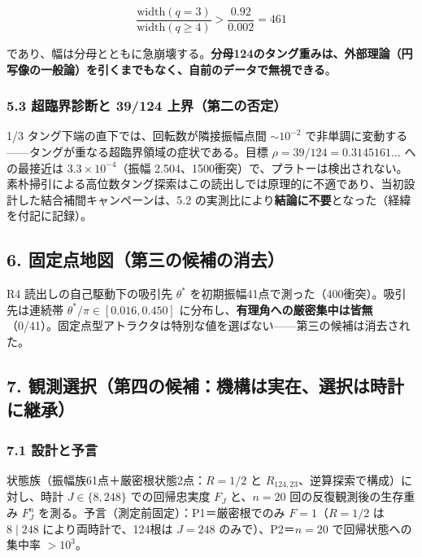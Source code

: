 \documentclass[
  a4paper,
]{ltjsarticle}
\begin{document}
\[
\frac{\mathrm{width}(q=3)}{\mathrm{width}(q\ge4)}>\frac{0.92}{0.002}=461
\]

であり、幅は分母とともに急崩壊する。\textbf{分母124のタング重みは、外部理論（円写像の一般論）を引くまでもなく、自前のデータで無視できる}。

\subsubsection{5.3 超臨界診断と 39/124
上界（第二の否定）}\label{ux8d85ux81e8ux754cux8a3aux65adux3068-39124-ux4e0aux754cux7b2cux4e8cux306eux5426ux5b9a}

1/3 タング下端の直下では、回転数が隣接振幅点間 \(\sim10^{-2}\)
で非単調に変動する------タングが重なる超臨界領域の症状である。目標
\(\rho=39/124=0.3145161\ldots\) への最接近は \(3.3\times10^{-4}\)（振幅
2.504、1500衝突）で、プラトーは検出されない。素朴掃引による高位数タング探索はこの読出しでは原理的に不適であり、当初設計した結合補間キャンペーンは、5.2
の実測比により\textbf{結論に不要}となった（経緯を付記に記録）。

\subsection{6.
固定点地図（第三の候補の消去）}\label{ux56faux5b9aux70b9ux5730ux56f3ux7b2cux4e09ux306eux5019ux88dcux306eux6d88ux53bb}

R4 読出しの自己駆動下の吸引先 \(\theta^*\)
を初期振幅41点で測った（400衝突）。吸引先は連続帯
\(\theta^*/\pi\in[0.016, 0.450]\)
に分布し、\textbf{有理角への厳密集中は皆無}（0/41）。固定点型アトラクタは特別な値を選ばない------第三の候補は消去された。

\subsection{7.
観測選択（第四の候補：機構は実在、選択は時計に継承）}\label{ux89b3ux6e2cux9078ux629eux7b2cux56dbux306eux5019ux88dcux6a5fux69cbux306fux5b9fux5728ux9078ux629eux306fux6642ux8a08ux306bux7d99ux627f}

\subsubsection{7.1 設計と予言}\label{ux8a2dux8a08ux3068ux4e88ux8a00}

状態族（振幅族61点＋厳密根状態2点：\(R=1/2\) と
\(R_{124,23}\)、逆算探索で構成）に対し、時計 \(J\in\{8,248\}\)
での回帰忠実度 \(F_J\) と、\(n=20\) 回の反復観測後の生存重み \(F_J^n\)
を測る。予言（測定前固定）：P1＝厳密根でのみ \(F=1\)（\(R=1/2\) は
\(8\mid248\) により両時計で、124根は \(J=248\) のみで）、P2＝\(n=20\)
で回帰状態への集中率 \(>10^3\)。
\end{document}
